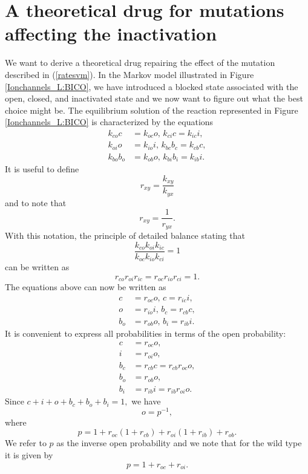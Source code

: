 \section[Drug for mutations of inactivation]{A theoretical drug for mutations affecting the inactivation}


We want to derive a theoretical drug repairing the effect of the mutation described in (\ref{ratesvm}). In the Markov model
illustrated in Figure  \ref{Ionchannels_L:BICO}, we have introduced a blocked state associated with the open, closed, and inactivated state and
we now want to figure out what the best choice might be.
The equilibrium solution of the reaction represented in Figure \ref{Ionchannels_L:BICO} is characterized by the equations
\begin{align*}
k_{co}c &  =k_{oc}o,\, k_{ci}c   =k_{ic}i,\\
k_{oi}o &  =k_{io}i,\, k_{bc}b_{c}   =k_{cb}c,\\
k_{bo}b_{o} &  =k_{ob}o, \, k_{bi}b_{i}   =k_{ib}i.
\end{align*}
It is useful to define
\[
r_{xy}=\frac{k_{xy}}{k_{yx}}
\]
and to note that
\[
r_{xy}=\frac{1}{r_{yx}}.
\]
With this notation, the principle of detailed balance stating that
\[
\frac{k_{co}k_{oi}k_{ic}}{k_{oc}k_{io}k_{ci}}=1
\]
can be written as
\[
r_{co}r_{oi}r_{ic}=r_{oc}r_{io}r_{ci}=1.
\]
The equations above can now be written as
\begin{align*}
c &  =r_{oc}o,\, c   =r_{ic}i,\\
o &  =r_{io}i,\, b_{c}   =r_{cb}c,\\
b_{o} &  =r_{ob}o,\, b_{i}   =r_{ib}i.
\end{align*}
It is convenient to express all probabilities in terms of the open probability:
\begin{align*}
c &  =r_{oc}o,\\
i &  =r_{oi}o,\\
b_{c} &  =r_{cb}c=r_{cb}r_{oc}o,\\
b_{o} &  =r_{ob}o,\\
b_{i} &  =r_{ib}i=r_{ib}r_{oi}o.
\end{align*}
Since $c+i+o+b_{c}+b_{o}+b_{i}=1,$ we have
\[
o=p^{-1},
\]
where
\[
p    =1+r_{oc}\left(  1+r_{cb}\right)  +r_{oi}\left(  1+r_{ib}\right)  +r_{ob}.
\]
We refer to $p$ as the inverse open probability and we note that for the wild type
it is given by
\[
p=1+r_{oc}+r_{oi}.
\]

